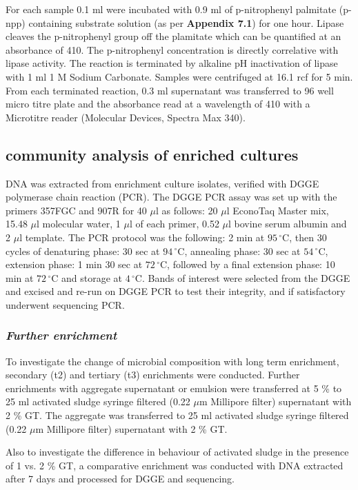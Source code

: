\documentclass{article}
\begin{document}
For each sample 0.1 ml were incubated with 0.9 ml of  p-nitrophenyl palmitate (p-npp) containing substrate solution (as per \textbf{Appendix 7.1}) for one hour. Lipase cleaves the p-nitrophenyl group off the plamitate which can be quantified at an absorbance of 410. The p-nitrophenyl concentration is directly correlative with lipase activity. The reaction is terminated by alkaline pH inactivation of lipase with 1 ml 1 M Sodium Carbonate. Samples were centrifuged at 16.1 rcf for 5 min. From each terminated reaction, 0.3 ml supernatant was transferred to 96 well micro titre plate and the absorbance read at a wavelength of 410 with a Microtitre reader (Molecular Devices, Spectra Max 340).

\subsection{community analysis of enriched cultures}
DNA was extracted from enrichment culture isolates, verified with DGGE polymerase chain reaction (PCR). The DGGE PCR assay was set up with the primers 357FGC and 907R for 40 $\mu$l as follows: 20 $\mu$l EconoTaq Master mix, 15.48 $\mu$l molecular water, 1 $\mu$l of each primer, 0.52 $\mu$l bovine serum albumin and 2 $\mu$l template. The PCR protocol was the following: 2 min at $95\,^{\circ}\mathrm{C}$, then 30 cycles of denaturing phase: 30 sec at $94\,^{\circ}\mathrm{C}$, annealing phase: 30 sec at  $54\,^{\circ}\mathrm{C}$, extension phase: 1 min 30 sec at $72\,^{\circ}\mathrm{C}$, followed by a final extension phase: 10 min at $72\,^{\circ}\mathrm{C}$ and storage at $4\,^{\circ}\mathrm{C}$.
Bands of interest were selected from the DGGE and excised and re-run on DGGE PCR to test their integrity, and if satisfactory underwent sequencing PCR. 

\subsubsection{\emph{Further enrichment}}
To investigate the change of microbial composition with long term enrichment, secondary (t2) and tertiary (t3) enrichments were conducted. Further enrichments with aggregate supernatant or emulsion were transferred at 5 \% to 25 ml activated sludge syringe filtered (0.22 $\mu$m Millipore filter) supernatant with 2 \% GT. The aggregate was transferred to 25 ml activated sludge syringe filtered (0.22 $\mu$m Millipore filter) supernatant with 2 \% GT. 


Also to investigate the difference in behaviour of activated sludge in the presence of 1 vs. 2 \% GT, a comparative enrichment was conducted with DNA extracted after 7 days and processed for DGGE and sequencing.
 
\end{document}
